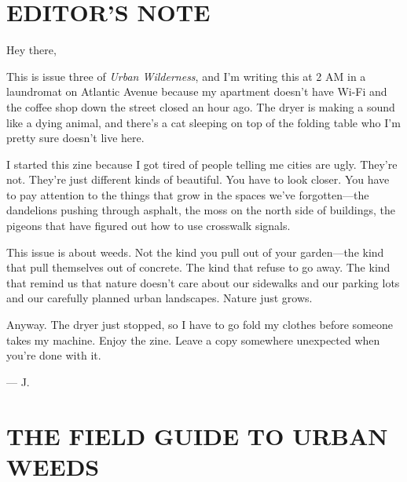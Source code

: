 \documentclass[
    language=english,
    doctype=zine,
    institution=none,
]{../../omnilatex}
\begin{document}
\vspace{0.5cm}

\section*{EDITOR'S NOTE}

Hey there,

This is issue three of \textit{Urban Wilderness}, and I'm writing this at 2 AM in a laundromat on Atlantic Avenue because my apartment doesn't have Wi-Fi and the coffee shop down the street closed an hour ago. The dryer is making a sound like a dying animal, and there's a cat sleeping on top of the folding table who I'm pretty sure doesn't live here.

I started this zine because I got tired of people telling me cities are ugly. They're not. They're just different kinds of beautiful. You have to look closer. You have to pay attention to the things that grow in the spaces we've forgotten---the dandelions pushing through asphalt, the moss on the north side of buildings, the pigeons that have figured out how to use crosswalk signals.

This issue is about weeds. Not the kind you pull out of your garden---the kind that pull themselves out of concrete. The kind that refuse to go away. The kind that remind us that nature doesn't care about our sidewalks and our parking lots and our carefully planned urban landscapes. Nature just grows.

Anyway. The dryer just stopped, so I have to go fold my clothes before someone takes my machine. Enjoy the zine. Leave a copy somewhere unexpected when you're done with it.

--- J.

\vspace{0.5cm}

\section*{THE FIELD GUIDE TO URBAN WEEDS}
\end{document}
